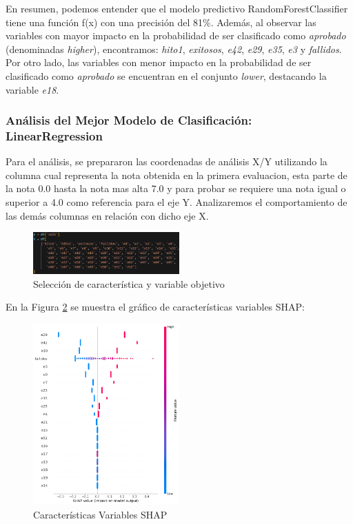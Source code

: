En resumen, podemos entender que el modelo predictivo RandomForestClassifier tiene una función f(x) con una precisión del 81\%. Además, al observar las variables con mayor impacto en la probabilidad de ser clasificado como \textit{aprobado} (denominadas \textit{higher}), encontramos: \textit{hito1}, \textit{exitosos}, \textit{e42}, \textit{e29}, \textit{e35}, \textit{e3} y \textit{fallidos}. Por otro lado, las variables con menor impacto en la probabilidad de ser clasificado como \textit{aprobado} se encuentran en el conjunto \textit{lower}, destacando la variable \textit{e18}.

\subsubsection{Análisis del Mejor Modelo de Clasificación: LinearRegression}

Para el análisis, se prepararon las coordenadas de análisis X/Y utilizando la columna  cual representa la nota obtenida en la primera evaluacion, esta parte de la nota 0.0 hasta la nota mas alta 7.0 y para probar se requiere una nota igual o superior a 4.0 como referencia para el eje Y. Analizaremos el comportamiento de las demás columnas en relación con dicho eje X.

\begin{figure}[H]
    \centering
    \includegraphics[width=0.5\textwidth]{img/shap_lr/dependencia_variable_objetivo.png}
    \caption{Selección de característica y variable objetivo}
    \label{fig:variables_entrenamiento_lr}
\end{figure}

En la Figura \ref{fig:caract_var_shap_lr1} se muestra el gráfico de características variables SHAP:

\begin{figure}[H]
    \centering
    \includegraphics[width=0.5\textwidth]{img/shap_lr/shapForcePlot_lr.png}
    \caption{Características Variables SHAP}
    \label{fig:caract_var_shap_lr1}
\end{figure}

